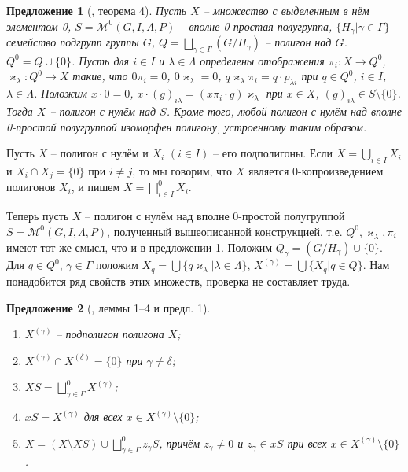 \documentclass[a4paper]{article}
\newtheorem{proposition}{Предложение}
\begin{document}
	\begin{proposition}[\cite{avdeev}, теорема 4] \label{pr02}
		Пусть $X$ -- множество с выделенным в нём элементом 0, $S=\mathcal{M}^0(G,I,\Lambda,P)$ -- вполне 0-простая полугруппа, $\{ H_\gamma | \gamma \in \Gamma \}$ -- семейство подгрупп группы $G$, $  Q = \bigsqcup_{\gamma \in \Gamma} (G/H_\gamma) $ -- полигон над $G$. $Q^0 = Q \cup \{0\}$. Пусть для $i \in I$ и $\lambda \in \Lambda$ определены отображения $\pi_i:X \rightarrow Q^0$, $\varkappa_\lambda: Q^0 \rightarrow X$ такие, что $0\pi_i = 0$, $0\varkappa_\lambda = 0$, $q \varkappa_\lambda \pi_i = q \cdot p_{\lambda i}$ при $q \in Q^0$, $i \in I$, $\lambda \in \Lambda$. Положим $x \cdot 0 = 0$, $x \cdot (g)_{i \lambda} = (x \pi_i \cdot g)\varkappa_{\lambda}$ при $x \in X$, $(g)_{i \lambda} \in S \setminus \{0\}$. Тогда $X$ -- полигон с нулём над $S$. Кроме того, любой полигон с нулём над вполне 0-простой полугруппой изоморфен полигону, устроенному таким образом.
	\end{proposition}
	
	\par Пусть $X$ -- полигон с нулём и $X_i$ $(i \in I)$ -- его подполигоны. Если $X = \bigcup_{i \in I} X_i$ и $X_i \cap X_j = \{0\}$ при $i \neq j$, то мы говорим, что $X$ является 0-копроизведением полигонов $X_i$, и пишем $X = \bigsqcup_{i \in I}^0 X_i$.
	
	\par Теперь пусть $X$ -- полигон с нулём над вполне 0-простой полугруппой $S=\mathcal{M}^0(G,I,\Lambda,P)$, полученный вышеописанной конструкцией, т.е. $Q^0,\varkappa_\lambda,\pi_i$ имеют тот же смысл, что и в предложении \ref{pr02}. Положим $Q_\gamma = (G/H_\gamma) \cup \{0\}$. Для $q \in Q^0$, $\gamma \in \Gamma$ положим $X_q = \bigcup\{q\varkappa_\lambda | \lambda \in \Lambda \}$, $X^{(\gamma)} = \bigcup\{X_q | q \in Q\}$. Нам понадобится ряд свойств этих множеств, проверка не составляет труда.
	
	\begin{proposition}[\cite{avdeev}, леммы 1--4 и предл. 1] \label{pr03}
		\
		\begin{enumerate}
			\item[(1)] $X^{(\gamma)}$ -- подполигон полигона $X$;
			\item[(2)] $X^{(\gamma)} \cap X^{(\delta)} = \{0\}$ при $\gamma \neq \delta$;
			\item[(3)] $XS = \bigsqcup_{\gamma \in \Gamma}^0 X^{(\gamma)}$;
			\item[(4)] $xS = X^{(\gamma)}$ для всех $x \in X^{(\gamma)} \setminus \{0\}$;
			\item[(5)] $X = (X \setminus XS) \cup \bigsqcup_{\gamma \in \Gamma}^0 z_{\gamma} S $, причём $z_\gamma \neq 0$ и $z_\gamma \in xS$ при всех $x \in X^{(\gamma)} \setminus \{0\}$.
		\end{enumerate}
	\end{proposition}
	
\end{document}
